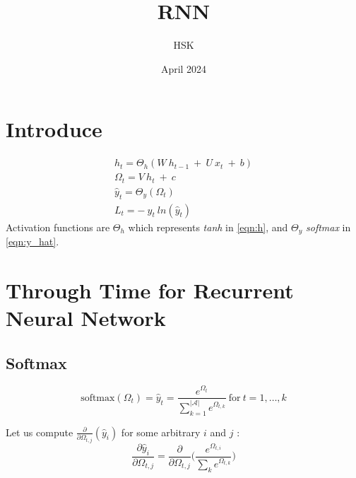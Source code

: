 \documentclass{article}
\title{RNN}
\author{HSK}
\date{April 2024}
\begin{document}
\maketitle
\section{Introduce}
\begin{eqnarray}
\label{eqn:h}
	h_t = \Theta_h(W ~h_{t-1}~+~U~x_t ~+~b)\\
\label{eqn:omega}
        \Omega_t = V ~h_{t}~+~c \\
\label{eqn:y_hat}
        \hat{y}_t = \Theta_y(\Omega_t)\\
\label{eqn:Loss}
        L_t = -~y_t~ln(\hat{y}_t)
\end{eqnarray}
Activation functions are $\Theta_h$ which represents \textit{tanh} in \eqref{eqn:h}, and $\Theta_y$ \textit{softmax} in \eqref{eqn:y_hat}.

\section{Through Time for Recurrent Neural Network}
\subsection{Softmax}
\begin{equation}\nonumber
\text{softmax} (\Omega_{t})=\hat{y}_{t}=\frac{e^{\Omega_t}}{\sum_{k=1}^{|\mathcal{A}|} e^{\Omega_{t,k}}} ~\text{for}~ t=1, \ldots, k
\end{equation}

%
Let us compute $\frac{\partial }{\partial \Omega_{t,j}} (\hat{y}_{i})$ for some arbitrary $i$ and $j$ :
$$
\frac{\partial \hat{y}_{i}}{\partial \Omega_{t,j}}=\frac{\partial}{\partial \Omega_{t,j}}\bigg( \frac{e^{\Omega_{t,i}}}{\sum_{k} e^{\Omega_{t,k}}}\bigg)
$$

\end{document}
